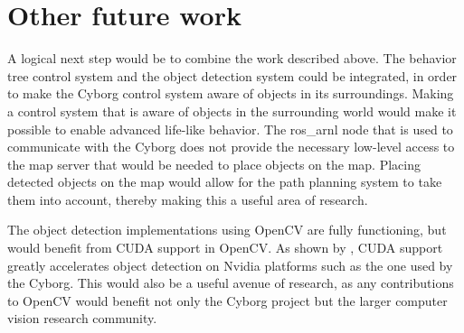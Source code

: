 \documentclass[\rootfolder/main.tex]{subfiles}
\begin{document}
\section{Other future work}

A logical next step would be to combine the work described above.
The behavior tree control system and the object detection system could be integrated, in order to make the Cyborg control system aware of objects in its surroundings.
Making a control system that is aware of objects in the surrounding world would make it possible to enable advanced life-like behavior.
The ros\_arnl node that is used to communicate with the Cyborg does not provide the necessary low-level access to the map server that would be needed to place objects on the map.
Placing detected objects on the map would allow for the path planning system to take them into account, thereby making this a useful area of research.

The object detection implementations using OpenCV are fully functioning, but would benefit from CUDA support in OpenCV.
As shown by \cite{Opheim2018}, CUDA support greatly accelerates object detection on Nvidia platforms such as the one used by the Cyborg.
This would also be a useful avenue of research, as any contributions to OpenCV would benefit not only the Cyborg project but the larger computer vision research community.
\end{document}
